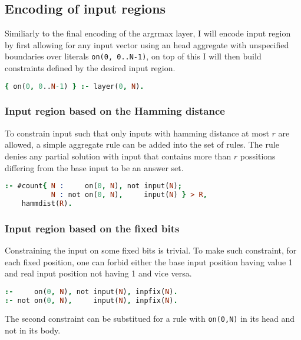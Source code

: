 \subsection{Encoding of input regions}

Similiarly to the final encoding of the argrmax layer, I will encode input region
by first allowing for any input vector using an head aggregate with unspecified boundaries
over literals \texttt{on(0, 0..N-1)}, on top of this I will then build constraints %
defined by the desired input region.

\begin{lstlisting}[language=Prolog, numbers=none]
{ on(0, 0..N-1) } :- layer(0, N).
\end{lstlisting}

\subsubsection{Input region based on the Hamming distance}

To constrain input such that only inputs with hamming distance at most $r$ are allowed,
a simple aggregate rule can be added into the set of rules.
The rule denies any partial solution with input that contains more than $r$ possitions
differing from the base input to be an answer set.

\begin{lstlisting}[language=Prolog, numbers=none]
:- #count{ N :     on(0, N), not input(N);
           N : not on(0, N),     input(N) } > R,
    hammdist(R).
\end{lstlisting}

\subsubsection{Input region based on the fixed bits}

Constraining the input on some fixed bits is trivial. To make such constraint,
for each fixed position, one can forbid either the base input position having value 1
and real input position not having 1 and vice versa.

\begin{lstlisting}[language=Prolog, numbers=none]
:-     on(0, N), not input(N), inpfix(N).
:- not on(0, N),     input(N), inpfix(N).
\end{lstlisting}

The second constraint can be substitued for a rule with \texttt{on(0,N)} %
in its head and not in its body.

